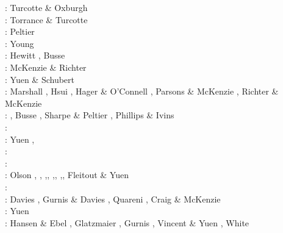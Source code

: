 \begin{scriptsize}
\nineteensixtyseven: Turcotte \& Oxburgh \cite{tuox67}\\
\nineteenseventyone: Torrance \& Turcotte \cite{totu71}\\
\nineteenseventytwo: Peltier \cite{pelt72}\\
\nineteenseventyfour: Young \cite{youn74}\\
\nineteenseventyfive: Hewitt \etal \cite{hemw75}, Busse \cite{buss75}\\
\nineteenseventysix: McKenzie \& Richter \cite{mcri76}\\
\nineteenseventyseven: Yuen \& Schubert \cite{yusc77} \\
\nineteenseventyeight: Marshall \etal \cite{mahz78}, Hsui \cite{hsui78}, Hager \& O'Connell \cite{haoc78},
                       Parsons \& McKenzie \cite{pamc78}, Richter \& McKenzie \cite{rimc78}\\
\nineteenseventynine: \cite{ludt79}, Busse \cite{buss79}, Sharpe \& Peltier \cite{shpe79},
                      Phillips \& Ivins \cite{phiv79}\\
\nineteeneighty: \cite{olco80}\cite{jamc80}\cite{scsc80}\cite{zess80}\\
\nineteeneightyone: Yuen \etal \cite{yups81}, \cite{buss81}\cite{jasc81}\cite{haoc81}\cite{cotu81}\\
\nineteeneightytwo: \cite{jape82}\cite{homc82}\cite{buri82}\\
\nineteeneightythree: \cite{hous83}\cite{hous83b}
                      \cite{chri83}\cite{mcke83}
                      \cite{chri83b}\cite{zesd83}\\
\nineteeneightyfour: Olson \etal \cite{olyb84}, \cite{jarv84},
                     \cite{haeb84},\cite{harp84},
                     \cite{davi84},\cite{boas84},
                     \cite{chri84},\cite{moca84},
                     Fleitout \& Yuen \cite{flyu84,flyu84b}\\
\nineteeneightyfive: \cite{jarv85}\cite{baum85}\cite{chri85}\cite{csra85}\cite{scan85}\\
\nineteeneightysix: Davies \cite{davi86}, Gurnis \& Davies \cite{guda86},
                    Quareni \etal \cite{quys86}, Craig \& McKenzie \cite{crmc86}\\
\nineteeneightyseven: Yuen \etal{}\cite{yuqh87}\\
\nineteeneightyeight: Hansen \& Ebel \cite{haeb88}, Glatzmaier \cite{glat88}, 
                      Gurnis \cite{gurn88}, Vincent \& Yuen \cite{viyu88},
                      White \cite{whit88}  \\ 

\end{scriptsize}
